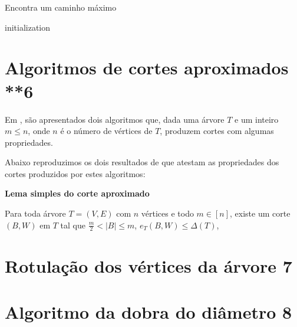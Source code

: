 \documentclass[a4paper,12pt]{article}
\begin{document}
\newpage

    		\begin{algorithm}[H]

				\caption{Encontra um caminho máximo}
				initialization\;
			\end{algorithm}	
    
    
\newpage
\section {Algoritmos de cortes aproximados **6}

Em \cite{Schmidt15}, são apresentados dois algoritmos que, dada uma 
árvore $T$ e um inteiro $m\le n$, onde $n$ é o número de vértices 
de $T$, produzem cortes com algumas propriedades.

Abaixo reproduzimos os dois resultados de \cite{Schmidt15} que 
atestam as propriedades dos cortes produzidos por estes algoritmos:

\bigskip

\textbf{Lema simples do corte aproximado} \cite{Schmidt15, Lemma 3}

Para toda árvore $T=(V,E)$ com $n$ vértices e todo $m \in [n]$,
existe um corte $(B,W)$ em $T$ tal que 
$\frac{m}{2} < \mid B\mid \le m$,
$e_T(B,W) \le \Delta(T)$,


\section {Rotulação dos vértices da árvore 7}


\section {Algoritmo da dobra do diâmetro 8}
\end{document}
